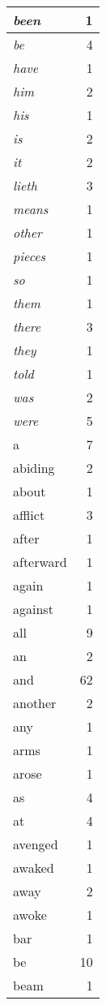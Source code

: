 \begin{center}
\begin{longtable}{l|r}
\emph{been} & 1\\ \hline 
\emph{be} & 4\\ \hline 
\emph{have} & 1\\ \hline 
\emph{him} & 2\\ \hline 
\emph{his} & 1\\ \hline 
\emph{is} & 2\\ \hline 
\emph{it} & 2\\ \hline 
\emph{lieth} & 3\\ \hline 
\emph{means} & 1\\ \hline 
\emph{other} & 1\\ \hline 
\emph{pieces} & 1\\ \hline 
\emph{so} & 1\\ \hline 
\emph{them} & 1\\ \hline 
\emph{there} & 3\\ \hline 
\emph{they} & 1\\ \hline 
\emph{told} & 1\\ \hline 
\emph{was} & 2\\ \hline 
\emph{were} & 5\\ \hline 
a & 7\\ \hline 
abiding & 2\\ \hline 
about & 1\\ \hline 
afflict & 3\\ \hline 
after & 1\\ \hline 
afterward & 1\\ \hline 
again & 1\\ \hline 
against & 1\\ \hline 
all & 9\\ \hline 
an & 2\\ \hline 
and & 62\\ \hline 
another & 2\\ \hline 
any & 1\\ \hline 
arms & 1\\ \hline 
arose & 1\\ \hline 
as & 4\\ \hline 
at & 4\\ \hline 
avenged & 1\\ \hline 
awaked & 1\\ \hline 
away & 2\\ \hline 
awoke & 1\\ \hline 
bar & 1\\ \hline 
be & 10\\ \hline 
beam & 1\\ \hline 

\end{longtable}
\end{center}
